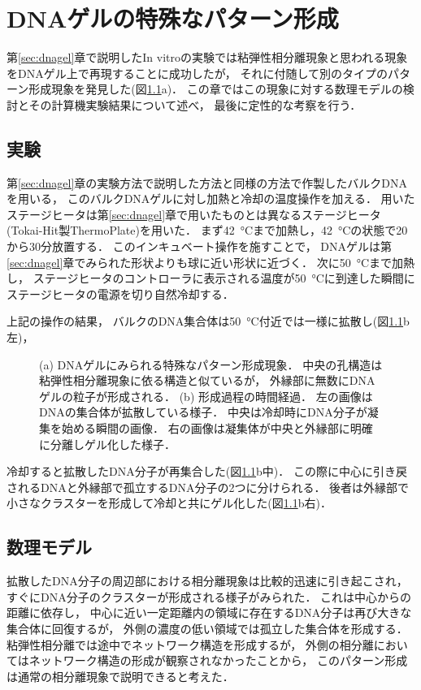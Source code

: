 \chapter{DNAゲルの特殊なパターン形成}

第\ref{sec:dnagel}章で説明したIn vitroの実験では粘弾性相分離現象と思われる現象をDNAゲル上で再現することに成功したが，
それに付随して別のタイプのパターン形成現象を発見した(図\ref{fig:result_special}a)．
この章ではこの現象に対する数理モデルの検討とその計算機実験結果について述べ，
最後に定性的な考察を行う．


\section{実験}
第\ref{sec:dnagel}章の実験方法で説明した方法と同様の方法で作製したバルクDNAを用いる，
このバルクDNAゲルに対し加熱と冷却の温度操作を加える．
用いたステージヒータは第\ref{sec:dnagel}章で用いたものとは異なるステージヒータ
(Tokai-Hit製ThermoPlate)を用いた．
まず\SI{42}{\celsius}まで加熱し，\SI{42}{\celsius}の状態で20から30分放置する．
このインキュベート操作を施すことで，
DNAゲルは第\ref{sec:dnagel}章でみられた形状よりも球に近い形状に近づく．
次に\SI{50}{\celsius}まで加熱し，
ステージヒータのコントローラに表示される温度が\SI{50}{\celsius}に到達した瞬間にステージヒータの電源を切り自然冷却する．

上記の操作の結果，
バルクのDNA集合体は\SI{50}{\celsius}付近では一様に拡散し(図\ref{fig:result_special}b左)，
\begin{figure}
    \centering
    
    \caption{
        (a) DNAゲルにみられる特殊なパターン形成現象．
            中央の孔構造は粘弾性相分離現象に依る構造と似ているが，
            外縁部に無数にDNAゲルの粒子が形成される．
        (b) 形成過程の時間経過．
            左の画像はDNAの集合体が拡散している様子．
            中央は冷却時にDNA分子が凝集を始める瞬間の画像．
            右の画像は凝集体が中央と外縁部に明確に分離しゲル化した様子．
    }
    \label{fig:result_special}
\end{figure}
冷却すると拡散したDNA分子が再集合した(図\ref{fig:result_special}b中)．
この際に中心に引き戻されるDNAと外縁部で孤立するDNA分子の2つに分けられる．
後者は外縁部で小さなクラスターを形成して冷却と共にゲル化した(図\ref{fig:result_special}b右)．


\section{数理モデル}
拡散したDNA分子の周辺部における相分離現象は比較的迅速に引き起こされ，
すぐにDNA分子のクラスターが形成される様子がみられた．
これは中心からの距離に依存し，
中心に近い一定距離内の領域に存在するDNA分子は再び大きな集合体に回復するが，
外側の濃度の低い領域では孤立した集合体を形成する．
粘弾性相分離では途中でネットワーク構造を形成するが，
外側の相分離においてはネットワーク構造の形成が観察されなかったことから，
このパターン形成は通常の相分離現象で説明できると考えた．

